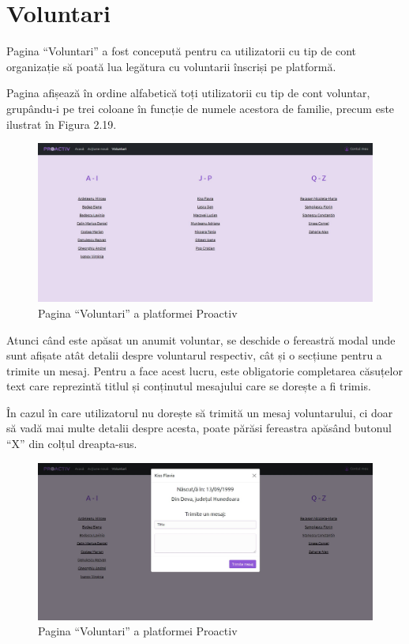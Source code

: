 \documentclass[12pt,a4paper]{report}
\begin{document}
\section{Voluntari}
\par
Pagina “Voluntari” a fost concepută pentru ca utilizatorii cu tip de cont organizație să poată lua legătura cu voluntarii înscriși pe platformă.
\\ \par
Pagina afișează în ordine alfabetică toți utilizatorii cu tip de cont voluntar, grupându-i pe trei coloane în funcție de numele acestora de familie, precum este ilustrat în Figura 2.19.
\begin{figure}[H]
\centering
  \includegraphics[width=0.95\linewidth]{./imagini/vol1.jpg}
  \caption{Pagina “Voluntari” a platformei Proactiv}
\end{figure}
\par
Atunci când este apăsat un anumit voluntar, se deschide o fereastră modal unde sunt afișate atât detalii despre voluntarul respectiv, cât și o secțiune pentru a trimite un mesaj. Pentru a face acest lucru, este obligatorie completarea căsuțelor text care reprezintă titlul și conținutul mesajului care se dorește a fi trimis.
\par
În cazul în care utilizatorul nu dorește să trimită un mesaj voluntarului, ci doar să vadă mai multe detalii despre acesta, poate părăsi fereastra apăsând butonul “X” din colțul dreapta-sus.
\begin{figure}[H]
\centering
  \includegraphics[width=0.95\linewidth]{./imagini/vol2.jpg}
  \caption{Pagina “Voluntari” a platformei Proactiv}
\end{figure}
\end{document}
